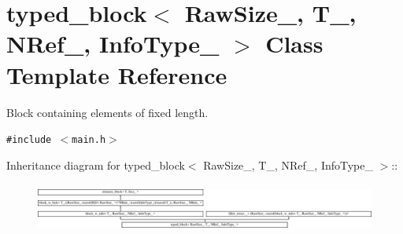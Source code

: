 \hypertarget{classtyped__block}{
\section{typed\_\-block$<$ RawSize\_\-, T\_\-, NRef\_\-, InfoType\_\- $>$ Class Template Reference}
\label{classtyped__block}
}
Block containing elements of fixed length.  


{\tt \#include $<$main.h$>$}

Inheritance diagram for typed\_\-block$<$ RawSize\_\-, T\_\-, NRef\_\-, InfoType\_\- $>$::\begin{figure}[H]
\begin{center}
\leavevmode
\includegraphics[height=1.64948cm]{classtyped__block}
\end{center}
\end{figure}
